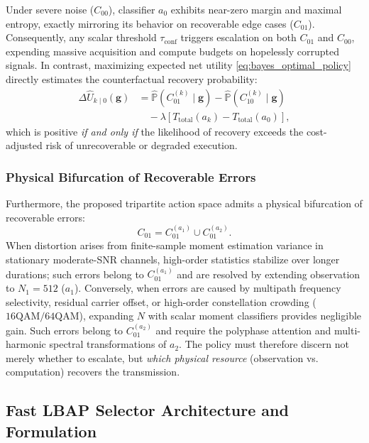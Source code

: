 Under severe noise ($C_{00}$), classifier $a_0$ exhibits near-zero margin and maximal entropy, exactly mirroring its behavior on recoverable edge cases ($C_{01}$). Consequently, any scalar threshold $\tau_{\mathrm{conf}}$ triggers escalation on both $C_{01}$ and $C_{00}$, expending massive acquisition and compute budgets on hopelessly corrupted signals. In contrast, maximizing expected net utility \eqref{eq:bayes_optimal_policy} directly estimates the counterfactual recovery probability:
\begin{align}
    \Delta \hat{U}_{k \mid 0}(\mathbf{g}) &= \hat{\mathbb{P}}(C_{01}^{(k)} \mid \mathbf{g}) - \hat{\mathbb{P}}(C_{10}^{(k)} \mid \mathbf{g}) \nonumber \\
    &\quad - \lambda [T_{\mathrm{total}}(a_k) - T_{\mathrm{total}}(a_0)],
    \label{eq:delta_utility}
\end{align}
which is positive \emph{if and only if} the likelihood of recovery exceeds the cost-adjusted risk of unrecoverable or degraded execution.

\subsubsection{Physical Bifurcation of Recoverable Errors}
Furthermore, the proposed tripartite action space admits a physical bifurcation of recoverable errors:
\begin{equation}
    C_{01} = C_{01}^{(a_1)} \cup C_{01}^{(a_2)}.
    \label{eq:bifurcation}
\end{equation}
When distortion arises from finite-sample moment estimation variance in stationary moderate-SNR channels, high-order statistics stabilize over longer durations; such errors belong to $C_{01}^{(a_1)}$ and are resolved by extending observation to $N_1 = 512$ ($a_1$). Conversely, when errors are caused by multipath frequency selectivity, residual carrier offset, or high-order constellation crowding ($16\mathrm{QAM} / 64\mathrm{QAM}$), expanding $N$ with scalar moment classifiers provides negligible gain. Such errors belong to $C_{01}^{(a_2)}$ and require the polyphase attention and multi-harmonic spectral transformations of $a_2$. The policy must therefore discern not merely whether to escalate, but \emph{which physical resource} (observation vs. computation) recovers the transmission.

\subsection{Fast LBAP Selector Architecture and Formulation}
\label{subsec:lbap_architecture}

